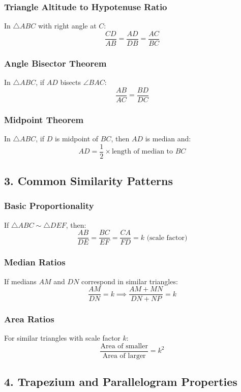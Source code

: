 \documentclass{article}
\begin{document}
\subsubsection*{Triangle Altitude to Hypotenuse Ratio}
In $\triangle ABC$ with right angle at $C$:
\[
\dfrac{CD}{AB} = \dfrac{AD}{DB} = \dfrac{AC}{BC}
\]

\subsubsection*{Angle Bisector Theorem}
In $\triangle ABC$, if $AD$ bisects $\angle BAC$:
\[
\dfrac{AB}{AC} = \dfrac{BD}{DC}
\]

\subsubsection*{Midpoint Theorem}
In $\triangle ABC$, if $D$ is midpoint of $BC$, then $AD$ is median and:
\[
AD = \dfrac{1}{2} \times \text{length of median to } BC
\]

\subsection*{3. Common Similarity Patterns}

\subsubsection*{Basic Proportionality}
If $\triangle ABC \sim \triangle DEF$, then:
\[
\dfrac{AB}{DE} = \dfrac{BC}{EF} = \dfrac{CA}{FD} = k \text{ (scale factor)}
\]

\subsubsection*{Median Ratios}
If medians $AM$ and $DN$ correspond in similar triangles:
\[
\dfrac{AM}{DN} = k \implies \dfrac{AM + MN}{DN + NP} = k
\]

\subsubsection*{Area Ratios}
For similar triangles with scale factor $k$:
\[
\dfrac{\text{Area of smaller}}{\text{Area of larger}} = k^2
\]

\subsection*{4. Trapezium and Parallelogram Properties}
\end{document}

